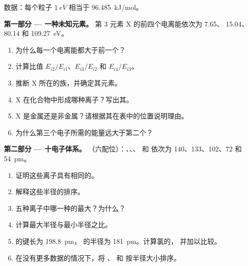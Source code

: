 \begin{problem}
\label{pb:b1:periodicity:1}
数据：每个粒子 $\qty{1}{eV}$ 相当于 \qty{96.485}{kJ/mol}。

\medskip
\noindent\textbf{第一部分 --- 一种未知元素。}
第 3 元素 X 的前四个电离能依次为 7.65、
15.04、80.14 和 \qty{109.27}{eV}。
\begin{enumerate}
  \item 为什么每一个电离能都大于前一个？
  \item 计算比值 $E_{i2}/E_{i1}$、$E_{i3}/E_{i2}$ 和
        $E_{i4}/E_{i3}$。
  \item 推断 X 所在的族，并确定其元素。
  \item X 在化合物中形成哪种离子？写出其。
  \item X 是金属还是非金属？请根据其在表中的位置说明理由。
  \item 为什么第三个电子所需的能量远大于第二个？
\end{enumerate}

\medskip
\noindent\textbf{第二部分 --- 十电子体系。}
（六配位）：、、、
 和  依次为 140、133、102、72 和 \qty{54}{pm}。
\begin{enumerate}[resume]
  \item 证明这些离子具有相同的。
  \item 解释这些半径的排序。
  \item 五种离子中哪一种的最大？为什么？
  \item 计算最大半径与最小半径之比。
  \item {} 的键长为 \qty{198.8}{pm}，
         的半径为 \qty{181}{pm}。计算氯的，
        并加以比较。
  \item 在没有更多数据的情况下，将 、 和 
        按半径大小排序。
\end{enumerate}


\end{problem}
